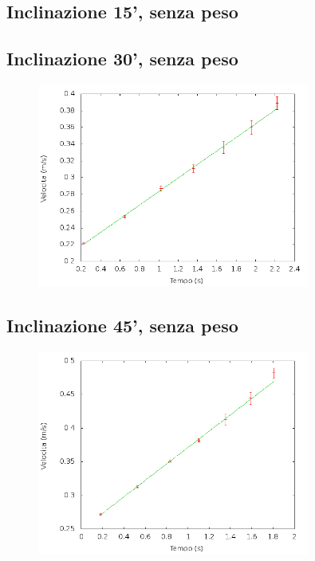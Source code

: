 \documentclass[12pt]{article} %
\begin{document}
	\subsection{Inclinazione 15', senza peso}
	\begin{figure}[H]
		\centering
		
		\label{fig:15n}
	\end{figure}
 
	\subsection {Inclinazione 30', senza peso}
	\begin{figure}[H]
		\centering
		\includegraphics[width=0.8\textwidth]{velocita_30gradi_normale}
		\label{fig:30n}
	\end{figure}
	
	\subsection {Inclinazione 45', senza peso}
	\begin{figure}[H]
		\centering
		\includegraphics[width=0.8\textwidth]{velocita_45gradi_normale}
		\label{fig:45n}
	\end{figure}
 
\end{document}
